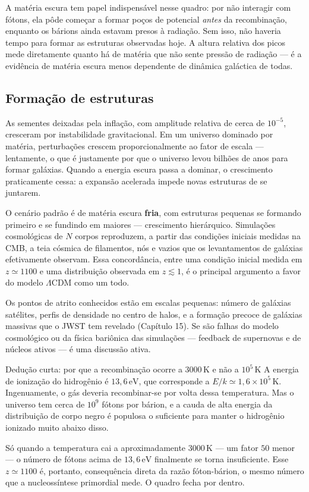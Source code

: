 \documentclass[11pt,a4paper]{article}
\begin{document}
A matéria escura tem papel indispensável nesse quadro: por não interagir com fótons, ela pôde começar a formar poços de potencial \emph{antes} da recombinação, enquanto os bárions ainda estavam presos à radiação. Sem isso, não haveria tempo para formar as estruturas observadas hoje. A altura relativa dos picos mede diretamente quanto há de matéria que não sente pressão de radiação --- é a evidência de matéria escura menos dependente de dinâmica galáctica de todas.

\subsection*{Formação de estruturas}

As sementes deixadas pela inflação, com amplitude relativa de cerca de $10^{-5}$, cresceram por instabilidade gravitacional. Em um universo dominado por matéria, perturbações crescem proporcionalmente ao fator de escala --- lentamente, o que é justamente por que o universo levou bilhões de anos para formar galáxias. Quando a energia escura passa a dominar, o crescimento praticamente cessa: a expansão acelerada impede novas estruturas de se juntarem.

O cenário padrão é de matéria escura \textbf{fria}, com estruturas pequenas se formando primeiro e se fundindo em maiores --- crescimento hierárquico. Simulações cosmológicas de $N$ corpos reproduzem, a partir das condições iniciais medidas na CMB, a teia cósmica de filamentos, nós e vazios que os levantamentos de galáxias efetivamente observam. Essa concordância, entre uma condição inicial medida em $z\simeq1100$ e uma distribuição observada em $z\lesssim1$, é o principal argumento a favor do modelo $\Lambda$CDM como um todo.

Os pontos de atrito conhecidos estão em escalas pequenas: número de galáxias satélites, perfis de densidade no centro de halos, e a formação precoce de galáxias massivas que o JWST tem revelado (Capítulo 15). Se são falhas do modelo cosmológico ou da física bariônica das simulações --- feedback de supernovas e de núcleos ativos --- é uma discussão ativa.

\begin{lessonblock}[borderline west={2pt}{0pt}{astroGold}]{Dedução curta: por que a recombinação ocorre a $3000\,\mathrm{K}$ e não a $10^{5}\,\mathrm{K}$}
A energia de ionização do hidrogênio é $13{,}6\,\mathrm{eV}$, que corresponde a $E/k\simeq1{,}6\times10^{5}\,\mathrm{K}$. Ingenuamente, o gás deveria recombinar-se por volta dessa temperatura. Mas o universo tem cerca de $10^{9}$ fótons por bárion, e a cauda de alta energia da distribuição de corpo negro é populosa o suficiente para manter o hidrogênio ionizado muito abaixo disso.

Só quando a temperatura cai a aproximadamente $3000\,\mathrm{K}$ --- um fator $50$ menor --- o número de fótons acima de $13{,}6\,\mathrm{eV}$ finalmente se torna insuficiente. Esse $z\simeq1100$ é, portanto, consequência direta da razão fóton-bárion, o mesmo número que a nucleossíntese primordial mede. O quadro fecha por dentro.
\end{lessonblock}
\end{document}
